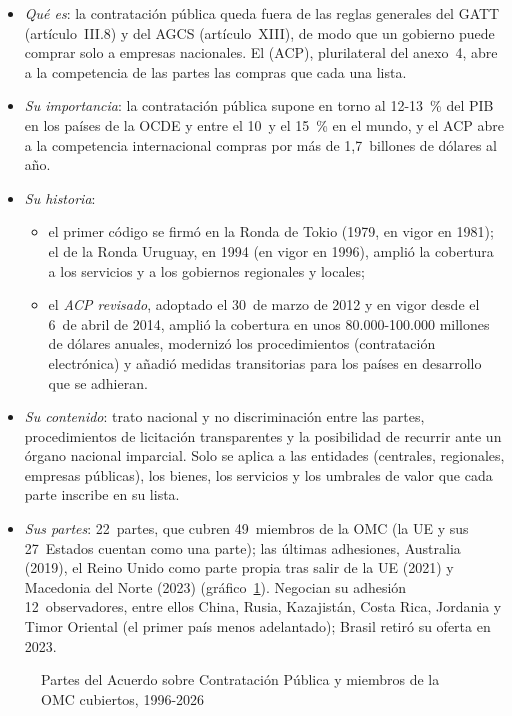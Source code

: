 \documentclass[11pt]{article}
\begin{document}
\begin{itemize}
\item \emph{Qué es}: la contratación pública queda fuera de las reglas generales del GATT (artículo~III.8) y del AGCS (artículo~XIII), de modo que un gobierno puede comprar solo a empresas nacionales. El  (ACP), plurilateral del anexo~4, abre a la competencia de las partes las compras que cada una lista\nocite{OMC2012ACP}.
\item \emph{Su importancia}: la contratación pública supone en torno al 12-13~\% del PIB en los países de la OCDE y entre el 10~y el 15~\% en el mundo, y el ACP abre a la competencia internacional compras por más de 1,7~billones de dólares al año\nocite{OMC2026ACP,OCDE2025Government}.
\item \emph{Su historia}:
  \begin{itemize}
  \item el primer código se firmó en la Ronda de Tokio (1979, en vigor en 1981); el de la Ronda Uruguay, en 1994 (en vigor en 1996), amplió la cobertura a los servicios y a los gobiernos regionales y locales;
  \item el \emph{ACP revisado}, adoptado el 30~de marzo de 2012 y en vigor desde el 6~de abril de 2014, amplió la cobertura en unos 80.000-100.000 millones de dólares anuales, modernizó los procedimientos (contratación electrónica) y añadió medidas transitorias para los países en desarrollo que se adhieran\nocite{OMC2012ACP}.
  \end{itemize}
\item \emph{Su contenido}: trato nacional y no discriminación entre las partes, procedimientos de licitación transparentes y la posibilidad de recurrir ante un órgano nacional imparcial. Solo se aplica a las entidades (centrales, regionales, empresas públicas), los bienes, los servicios y los umbrales de valor que cada parte inscribe en su lista.
\item \emph{Sus partes}: 22~partes, que cubren 49~miembros de la OMC (la UE y sus 27~Estados cuentan como una parte); las últimas adhesiones, Australia (2019), el Reino Unido como parte propia tras salir de la UE (2021) y Macedonia del Norte (2023) (gráfico~\ref{fig:acp}). Negocian su adhesión 12~observadores, entre ellos China, Rusia, Kazajistán, Costa Rica, Jordania y Timor Oriental (el primer país menos adelantado); Brasil retiró su oferta en 2023\nocite{OMC2026ACP}.
\end{itemize}

\begin{figure}[H]
\centering
\caption{Partes del Acuerdo sobre Contratación Pública y miembros de la OMC cubiertos, 1996-2026}\label{fig:acp}
\end{figure}
\end{document}
